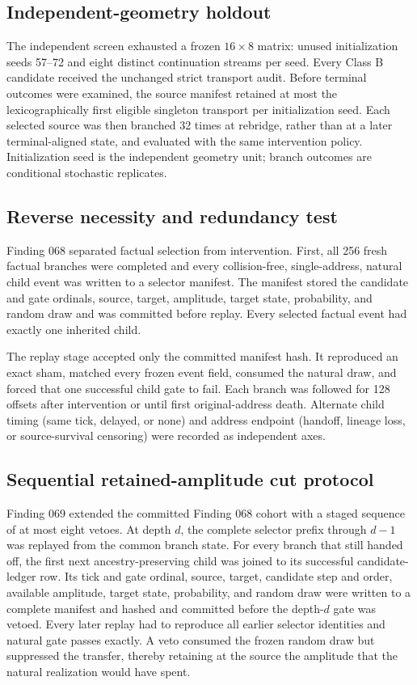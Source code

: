 \subsection{Independent-geometry holdout}

The independent screen exhausted a frozen $16\times8$ matrix: unused
initialization seeds 57--72 and eight distinct continuation streams per seed.
Every Class B candidate received the unchanged strict transport audit. Before
terminal outcomes were examined, the source manifest retained at most the
lexicographically first eligible singleton transport per initialization seed.
Each selected source was then branched 32 times at rebridge, rather than at a
later terminal-aligned state, and evaluated with the same intervention policy.
Initialization seed is the independent geometry unit; branch outcomes are
conditional stochastic replicates.

\subsection{Reverse necessity and redundancy test}

Finding 068 separated factual selection from intervention. First, all 256 fresh
factual branches were completed and every collision-free, single-address,
natural child event was written to a selector manifest. The manifest stored the
candidate and gate ordinals, source, target, amplitude, target state,
probability, and random draw and was committed before replay. Every selected
factual event had exactly one inherited child.

The replay stage accepted only the committed manifest hash. It reproduced an
exact sham, matched every frozen event field, consumed the natural draw, and
forced that one successful child gate to fail. Each branch was followed for 128
offsets after intervention or until first original-address death. Alternate
child timing (same tick, delayed, or none) and address endpoint (handoff, lineage
loss, or source-survival censoring) were recorded as independent axes.

\subsection{Sequential retained-amplitude cut protocol}

Finding 069 extended the committed Finding 068 cohort with a staged sequence of
at most eight vetoes. At depth $d$, the complete selector prefix through
$d-1$ was replayed from the common branch state. For every branch that still
handed off, the first next ancestry-preserving child was joined to its successful
candidate-ledger row. Its tick and gate ordinal, source, target, candidate
step and order, available amplitude, target state, probability, and random draw
were written to a complete manifest and hashed and committed before the depth-$d$
gate was vetoed. Every later replay had to reproduce all earlier selector
identities and natural gate passes exactly. A veto consumed the frozen random
draw but suppressed the transfer, thereby retaining at the source the amplitude
that the natural realization would have spent.

